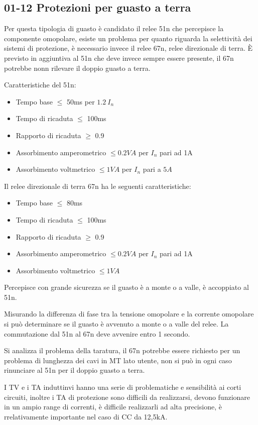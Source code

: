 
\subsection{01-12 Protezioni per guasto a terra}
Per questa tipologia di guasto è candidato il relee 51n che percepisce la componente omopolare, esiste un problema per quanto riguarda la selettività dei sistemi di protezione, è necessario invece il relee 67n, relee direzionale di terra. È previsto in aggiuntiva al 51n che deve invece sempre essere presente, il 67n potrebbe nonn rilevare il doppio guasto a terra.

Caratteristiche del 51n:
\begin{itemize}
    \item Tempo base $\leq$ 50ms per $1.2 \ I_n$
    \item Tempo di ricaduta $\leq$ 100ms
    \item Rapporto di ricaduta $\geq$ 0.9
    \item Assorbimento amperometrico $\leq 0.2 VA$ per $I_n$ pari ad 1A
    \item Assorbimento voltmetrico $\leq 1 VA$ per $I_n$ pari a $5A$
\end{itemize} 

Il relee direzionale di terra 67n ha le seguenti caratteristiche:
\begin{itemize}
    \item Tempo base $\leq$ 80ms
    \item Tempo di ricaduta $\leq$ 100ms
    \item Rapporto di ricaduta $\geq$ 0.9
    \item Assorbimento amperometrico $\leq 0.2 VA$ per $I_n$ pari ad 1A
    \item Assorbimento voltmetrico $\leq 1 VA$
\end{itemize}
Percepisce con grande sicurezza se il guasto è a monte o a valle, è accoppiato al 51n.

Misurando la differenza di fase tra la tensione omopolare e la corrente omopolare si può determinare se il guasto è avvenuto a monte o a valle del relee.
La commutazione dal 51n al 67n deve avvenire entro 1 secondo.

Si analizza il problema della taratura, il 67n potrebbe essere richiesto per un problema di lunghezza dei cavi in MT lato utente, non si può in ogni caso rinunciare al 51n per il doppio guasto a terra.

I TV e i TA induttinvi hanno una serie di problematiche e sensibilità ai corti circuiti, inoltre i TA di protezione sono difficili da realizzarsi, devono funzionare in un ampio range di correnti, è difficile realizzarli ad alta precisione, è rrelativamente importante nel caso di CC da 12,5kA.

